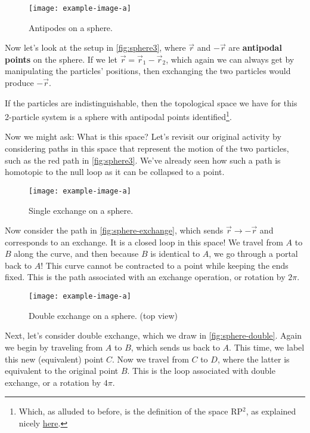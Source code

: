 \documentclass[12pt, english]{book}
\begin{document}
\begin{figure}[!ht]
	\centering 
	\texttt{[image: example-image-a]}
	\caption{Antipodes on a sphere.}
	\label{fig:sphere3}
\end{figure}

Now let's look at the setup in \autoref{fig:sphere3}, where $\vec{r}$ and $-\vec{r}$ are \textbf{antipodal points} on the sphere.
If we let $\vec{r} = \vec{r}_1 - \vec{r}_2$, which again we can always get by manipulating the particles' positions, then exchanging the two particles would produce $-\vec{r}$.

If the particles are indistinguishable, then the topological space we have for this 2-particle system is a sphere with antipodal points identified\footnote{Which, as alluded to before, is the definition of the space RP$^2$, as explained nicely \href{https://www.popmath.org.uk/sculpmath/pagesm/plane.html}{here}.}.

Now we might ask: What is this space?
Let's revisit our original activity by considering paths in this space that represent the motion of the two particles, such as the red path in \autoref{fig:sphere3}.
We've already seen how such a path is homotopic to the null loop as it can be collapsed to a point.

\begin{figure}[!ht]
	\centering 
	\texttt{[image: example-image-a]}
	\caption{Single exchange on a sphere.}
	\label{fig:sphere-exchange}
\end{figure}

Now consider the path in \autoref{fig:sphere-exchange}, which sends $\vec{r} \rightarrow -\vec{r}$ and corresponds to an exchange.
It is a closed loop in this space!
We travel from $A$ to $B$ along the curve, and then because $B$ is identical to $A$, we go through a portal back to $A$! 
This curve cannot be contracted to a point while keeping the ends fixed.
This is the path associated with an exchange operation, or rotation by $2\pi$.

\begin{figure}[!ht]
	\centering 
	\texttt{[image: example-image-a]}
	\caption{Double exchange on a sphere. (top view)}
	\label{fig:sphere-double}
\end{figure}

Next, let's consider double exchange, which we draw in \autoref{fig:sphere-double}. 
Again we begin by traveling from $A$ to $B$, which sends us back to $A$.
This time, we label this new (equivalent) point $C$.
Now we travel from $C$ to $D$, where the latter is equivalent to the original point $B$. 
This is the loop associated with double exchange, or a rotation by $4\pi$.
\end{document}
